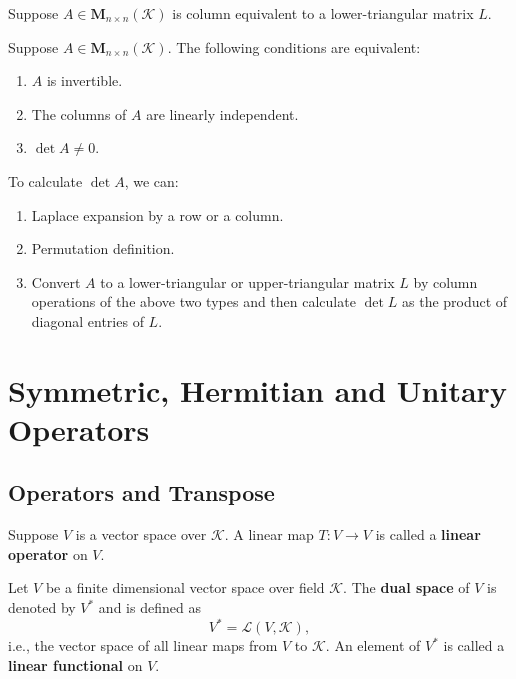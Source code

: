 \documentclass{ctexart}
\newcommand{\M}{\mathbf{M}}
\begin{document}
    \begin{mythm}
        Suppose $A\in \M_{n \times n}(\mathcal{K})$ is column equivalent to a lower-triangular matrix $L$.
    \end{mythm}
    \begin{mythm}
        Suppose $A\in \M_{n \times n}(\mathcal{K})$. The following conditions are equivalent:
        \begin{enumerate}
            \item $A$ is invertible.
            \item The columns of $A$ are linearly independent.
            \item $\det A \neq 0$.
        \end{enumerate}
    \end{mythm}
    \begin{myrmk}
        To calculate $\det A$, we can:
        \begin{enumerate}
            \item Laplace expansion by a row or a column.
            \item Permutation definition.
            \item Convert $A$ to a lower-triangular or upper-triangular matrix $L$ by column operations of the above two types and then calculate $\det L$ as the product of diagonal entries of $L$.
        \end{enumerate}
    \end{myrmk}

    \section{Symmetric, Hermitian and Unitary Operators}
    \subsection{Operators and Transpose}
    \begin{mydef}
        Suppose $V$ is a vector space over $\mathcal{K}$. A linear map $T: V \to V$ is called a \textbf{linear operator} on $V$. 
    \end{mydef}
    \begin{mydef}
    Let $V$ be a finite dimensional vector space over field $\mathcal{K}$. The \textbf{dual space} of $V$ is denoted by $V^*$ and is defined as
    \[
    V^*=\mathcal{L}(V,\mathcal{K}),
    \]
    i.e., the vector space of all linear maps from $V$ to $\mathcal{K}$. An element of $V^*$ is called a \textbf{linear functional} on $V$.
    \end{mydef}
\end{document}
